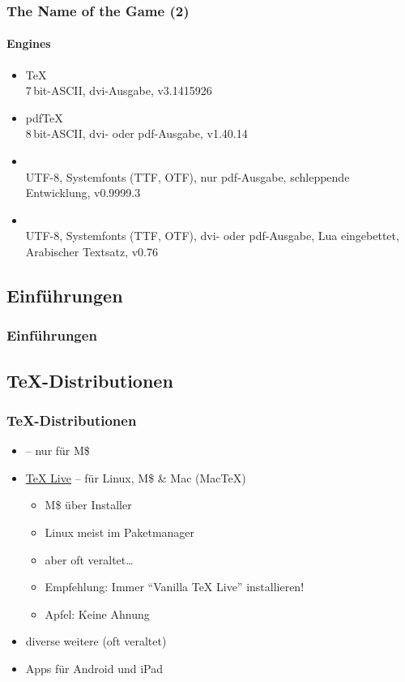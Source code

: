 \documentclass[t,ngerman]{beamer}
\begin{document}
\begin{frame}
  \frametitle{The Name of the Game (2)}
  \framesubtitle{Engines}
  \begin{itemize}
  \item \TeX\\
    7\,bit-ASCII, dvi-Ausgabe, v3.1415926
  \item pdf\TeX\\
    8\,bit-ASCII, dvi- oder pdf-Ausgabe, v1.40.14
  \item {}\\
    UTF-8, Systemfonts (TTF, OTF), nur pdf-Ausgabe, schleppende
    Entwicklung, v0.9999.3
  \item {}\\
    UTF-8, Systemfonts (TTF, OTF), dvi- oder pdf-Ausgabe, Lua
    eingebettet, Arabischer Textsatz, v0.76
  \end{itemize}
\end{frame}

\subsection{Einf\"uhrungen}

\begin{frame}
  \frametitle{Einführungen}
  \nocite{voss2012,l2short}
  \begingroup
  \printbibliography[heading=none]
  \endgroup
\end{frame}

\subsection{\TeX-Distributionen}

\begin{frame}
  \frametitle{\TeX-Distributionen}
  \begin{itemize}
  \item \href{http://miktex.org}{} – nur für M\$
  \item \href{http://tug.org/texlive}{\TeX{} Live} – für Linux, M\$ \&
    Mac (Mac\TeX)
    \begin{itemize}
    \item M\$ über Installer
    \item Linux meist im Paketmanager
    \item \alert{aber} oft veraltet\dots
    \item Empfehlung: Immer \enquote{Vanilla \TeX{} Live}
      installieren!
    \item Apfel: Keine Ahnung
    \end{itemize}
  \item diverse weitere (oft veraltet)
  \item Apps für Android und iPad
  \end{itemize}
\end{frame}
\end{document}
